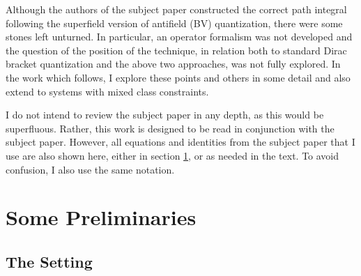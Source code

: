 \documentclass[a4paper,12pt]{article}
\theoremstyle{definition}
\theoremstyle{remark}
\numberwithin{equation}{section}
\begin{document}
Although the authors of the subject paper \cite{Batalin:2001hs}
constructed the correct path integral following the superfield
version of antifield (BV) quantization, there were some stones left
unturned. In particular, an operator formalism was not developed
and the question of the position of the technique, in relation
both to standard Dirac bracket quantization and the above two
approaches, was not fully explored. In the work which follows, I
explore these points and others in some detail and also extend
to systems with mixed class constraints.

I do not intend to review the subject paper in any depth, as this
would be superfluous. Rather, this work is designed to be read in
conjunction with the subject paper. However, all equations and
identities from the subject paper that I use are also shown here,
either in section \ref{sec:BMequations}, or as needed in the text.
To avoid confusion, I also use the same notation.

\section{Some Preliminaries}
\label{sec:BMequations}

\subsection{The Setting}
\label{sec:Setting}
\end{document}
